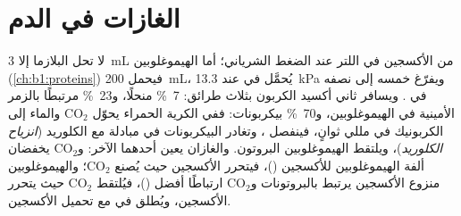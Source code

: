 \section{الغازات في الدم}

\begin{proposition}\label{prop:b1:gas-exchange:transport}
لا تحل البلازما إلا \qty{3}{mL} من الأكسجين في اللتر عند الضغط
الشرياني؛ أما الهيموغلوبين (\cref{ch:b1:proteins}) فيحمل
\qty{200}{mL}، يُحمَّل في  عند \qty{13.3}{kPa} ويفرّغ خمسه إلى
نصفه في . ويسافر ثاني أكسيد الكربون بثلاث طرائق:
\qty{7}{\%} منحلًا، و\qty{23}{\%} مرتبطًا بالزمر الأمينية في
الهيموغلوبين، و\qty{70}{\%} بيكربونات: ففي الكرية الحمراء يحوّل
\emph{} $\mathrm{CO_2}$ والماء إلى  الكربونيك
في مللي ثوانٍ، فينفصل ، وتغادر البيكربونات  في مبادلة
مع الكلوريد (\emph{انزياح الكلوريد})، ويلتقط الهيموغلوبين
البروتون. والغازان يعين أحدهما الآخر:  و$\mathrm{CO_2}$
يخفضان ألفة الهيموغلوبين للأكسجين (\emph{})، فيتحرر
الأكسجين حيث يُصنع $\mathrm{CO_2}$؛ والهيموغلوبين منزوع الأكسجين
يرتبط بالبروتونات و$\mathrm{CO_2}$ ارتباطًا أفضل (\emph{})، فيُلتقط $\mathrm{CO_2}$ حيث يتحرر الأكسجين، ويُطلق في
 مع تحميل الأكسجين.
\end{proposition}

